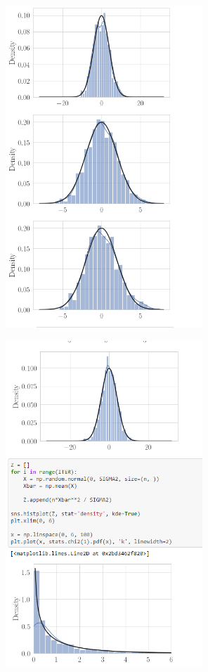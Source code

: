 \documentclass[12pt]{article}
\begin{document}
\begin{figure}[p]
	\centering
	\includegraphics[width=0.66\textwidth]{Code2.PNG}
\end{figure}
\begin{figure}[p]
	\centering
	\includegraphics[width=0.66\textwidth]{Code3.PNG}
\end{figure}
\end{document}
